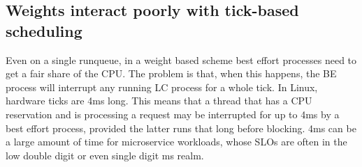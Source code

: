 \subsection{Weights interact poorly with tick-based
scheduling}\label{ss:problem:quantum}

Even on a single runqueue, in a weight based scheme best effort processes need
to get a fair share of the CPU. The problem is that, when this happens, the BE
process will interrupt any running LC process for a whole tick. In Linux,
hardware ticks are 4ms long. This means that a thread that has a CPU reservation
and is processing a request may be interrupted for up to 4ms by a best effort
process, provided the latter runs that long before blocking. 4ms can be a large
amount of time for microservice workloads, whose SLOs are often in the low
double digit or even single digit ms realm.~\cite{in-the-plex, sigmaos}



